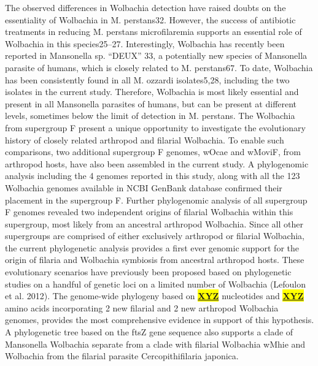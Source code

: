 \documentclass[10pt, a4paper, twocolumn]{article} %
\begin{document}
The observed differences in Wolbachia detection have raised doubts on the essentiality of Wolbachia in M. perstans32. However, the success of antibiotic treatments in reducing M. perstans microfilaremia supports an essential role of Wolbachia in this species25–27. Interestingly, Wolbachia has recently been reported in Mansonella sp. “DEUX” 33, a potentially new species of Mansonella parasite of humans, which is closely related to M. perstans67. To date, Wolbachia has been consistently found in all M. ozzardi isolates5,28, including the two isolates in the current study. Therefore, Wolbachia is most likely essential and present in all Mansonella parasites of humans, but can be present at different levels, sometimes below the limit of detection in M. perstans. 
The Wolbachia from supergroup F present a unique opportunity to investigate the evolutionary history of closely related arthropod and filarial Wolbachia. To enable such comparisons, two additional supergroup F genomes, wOcae and wMoviF, from arthropod hosts, have also been assembled in the current study. A phylogenomic analysis including the 4 genomes reported in this study, along with all the 123 Wolbachia genomes available in NCBI GenBank database confirmed their placement in the supergroup F. Further phylogenomic analysis of all supergroup F genomes revealed two independent origins of filarial Wolbachia within this supergroup, most likely from an ancestral arthropod Wolbachia. Since all other supergroups are comprised of either exclusively arthropod or filarial Wolbachia, the current phylogenetic analysis provides a first ever genomic support for the origin of filaria and Wolbachia symbiosis from ancestral arthropod hosts. These evolutionary scenarios have previously been proposed based on phylogenetic studies on a handful of genetic loci on a limited number of Wolbachia (Lefoulon et al. 2012). The genome-wide phylogeny based on \underline{\textbf{\colorbox{Yellow}{XYZ}}} nucleotides and \underline{\textbf{\colorbox{Yellow}{XYZ}}} amino acids incorporating 2 new filarial and 2 new arthropod Wolbachia genomes, provides the most comprehensive evidence in support of this hypothesis. A phylogenetic tree based on the ftsZ gene sequence also supports a clade of Mansonella Wolbachia separate from a clade with filarial Wolbachia wMhie and Wolbachia from the filarial parasite Cercopithifilaria japonica. 
\end{document}

